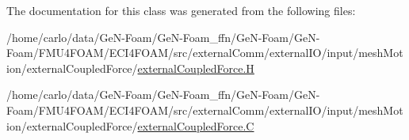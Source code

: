 The documentation for this class was generated from the following files\+:\begin{DoxyCompactItemize}
\item 
/home/carlo/data/\+Ge\+N-\/\+Foam/\+Ge\+N-\/\+Foam\+\_\+ffn/\+Ge\+N-\/\+Foam/\+Ge\+N-\/\+Foam/\+F\+M\+U4\+F\+O\+A\+M/\+E\+C\+I4\+F\+O\+A\+M/src/external\+Comm/external\+I\+O/input/mesh\+Motion/external\+Coupled\+Force/\hyperlink{externalCoupledForce_8H}{external\+Coupled\+Force.\+H}\item 
/home/carlo/data/\+Ge\+N-\/\+Foam/\+Ge\+N-\/\+Foam\+\_\+ffn/\+Ge\+N-\/\+Foam/\+Ge\+N-\/\+Foam/\+F\+M\+U4\+F\+O\+A\+M/\+E\+C\+I4\+F\+O\+A\+M/src/external\+Comm/external\+I\+O/input/mesh\+Motion/external\+Coupled\+Force/\hyperlink{externalCoupledForce_8C}{external\+Coupled\+Force.\+C}\end{DoxyCompactItemize}
